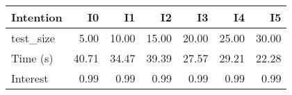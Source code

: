 \begin{tabular}{lrrrrrr}
\toprule
Intention & I0 & I1 & I2 & I3 & I4 & I5 \\
\midrule
test_size & 5.00 & 10.00 & 15.00 & 20.00 & 25.00 & 30.00 \\
Time (s) & 40.71 & 34.47 & 39.39 & 27.57 & 29.21 & 22.28 \\
Interest & 0.99 & 0.99 & 0.99 & 0.99 & 0.99 & 0.99 \\
\bottomrule
\end{tabular}
